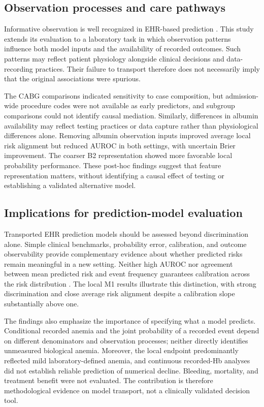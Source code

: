 \documentclass[pdflatex,sn-mathphys-num]{sn-jnl}%
\theoremstyle{thmstyleone}%
\theoremstyle{thmstyletwo}%
\theoremstyle{thmstylethree}%
\begin{document}
\subsection{Observation processes and care pathways}

Informative observation is well recognized in EHR-based prediction \cite{sisk2021,agniel2018,yamamoto2026}. This study extends its evaluation to a laboratory task in which observation patterns influence both model inputs and the availability of recorded outcomes. Such patterns may reflect patient physiology alongside clinical decisions and data-recording practices. Their failure to transport therefore does not necessarily imply that the original associations were spurious.

The CABG comparisons indicated sensitivity to case composition, but admission-wide procedure codes were not available as early predictors, and subgroup comparisons could not identify causal mediation. Similarly, differences in albumin availability may reflect testing practices or data capture rather than physiological differences alone. Removing albumin observation inputs improved average local risk alignment but reduced AUROC in both settings, with uncertain Brier improvement. The coarser B2 representation showed more favorable local probability performance. These post-hoc findings suggest that feature representation matters, without identifying a causal effect of testing or establishing a validated alternative model.

\subsection{Implications for prediction-model evaluation}

Transported EHR prediction models should be assessed beyond discrimination alone. Simple clinical benchmarks, probability error, calibration, and outcome observability provide complementary evidence about whether predicted risks remain meaningful in a new setting. Neither high AUROC nor agreement between mean predicted risk and event frequency guarantees calibration across the risk distribution \cite{vancalster2019,vancalster2016}. The local M1 results illustrate this distinction, with strong discrimination and close average risk alignment despite a calibration slope substantially above one.

The findings also emphasize the importance of specifying what a model predicts. Conditional recorded anemia and the joint probability of a recorded event depend on different denominators and observation processes; neither directly identifies unmeasured biological anemia. Moreover, the local endpoint predominantly reflected mild laboratory-defined anemia, and continuous recorded-Hb analyses did not establish reliable prediction of numerical decline. Bleeding, mortality, and treatment benefit were not evaluated. The contribution is therefore methodological evidence on model transport, not a clinically validated decision tool.
\end{document}
